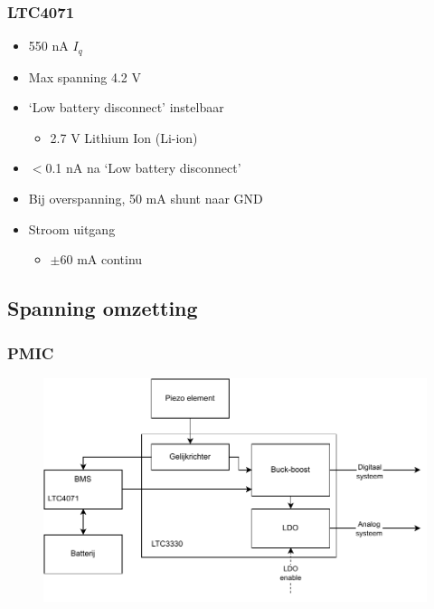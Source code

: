     \begin{frame}
        \frametitle{LTC4071}
        \begin{itemize}
            \item 550 nA $I_q$
            \item Max spanning 4.2 V
            \item `Low battery disconnect' instelbaar
                \begin{itemize}
                    \item 2.7 V Lithium Ion (Li-ion)
                \end{itemize}
            \item $<$0.1 nA na `Low battery disconnect'
            \item Bij overspanning, 50 mA shunt naar GND
            \item Stroom uitgang
                \begin{itemize}
                    \item $\pm 60$ mA continu 
                \end{itemize}
        \end{itemize}

    \end{frame}

    \subsection{Spanning omzetting}

    \begin{frame}
        \frametitle{PMIC}
        \begin{figure}[h]
            \centering
            \includegraphics[scale=0.6]{img/energie_systeem.pdf}
        \end{figure}
    \end{frame}
    
